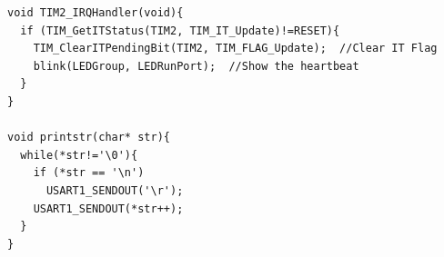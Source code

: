 \documentclass[a4paper]{ctexart}
\begin{document}
\begin{lstlisting}[caption={Main file},label={mainc}]
void TIM2_IRQHandler(void){
  if (TIM_GetITStatus(TIM2, TIM_IT_Update)!=RESET){
    TIM_ClearITPendingBit(TIM2, TIM_FLAG_Update);  //Clear IT Flag
    blink(LEDGroup, LEDRunPort);  //Show the heartbeat
  }
}

void printstr(char* str){
  while(*str!='\0'){
    if (*str == '\n')
      USART1_SENDOUT('\r');
    USART1_SENDOUT(*str++);
  }
}
\end{lstlisting}
\end{document}
